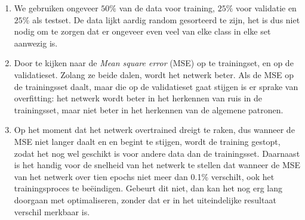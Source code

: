 \documentclass[a4paper,10pt,fleqn]{article}
\begin{document}
\begin{enumerate}[1.]
\begin{center}
	\end{center}

	\item We gebruiken ongeveer $50\%$ van de data voor training, $25\%$ voor validatie en $25\%$ als testset. De data lijkt aardig random gesorteerd te zijn, het is dus niet nodig om te zorgen dat er ongeveer even veel van elke class in elke set aanwezig is.

	\item Door te kijken naar de \textit{Mean square error} (MSE) op te trainingset, en op de validatieset. Zolang ze beide dalen, wordt het netwerk beter. Als de MSE op de trainingsset daalt, maar die op de validatieset gaat stijgen is er sprake van overfitting: het netwerk wordt beter in het herkennen van ruis in de trainingsset, maar niet beter in het herkennen van de algemene patronen.

	\item Op het moment dat het netwerk overtrained dreigt te raken, dus wanneer de MSE niet langer daalt en en begint te stijgen, wordt de training gestopt, zodat het nog wel geschikt is voor andere data dan de trainingsset. Daarnaast is het handig voor de snelheid van het netwerk te stellen dat wanneer de MSE van het netwerk over tien epochs niet meer dan 0.1\% verschilt, ook het trainingsproces te beëindigen. Gebeurt dit niet, dan kan het nog erg lang doorgaan met optimaliseren, zonder dat er in het uiteindelijke resultaat verschil merkbaar is.


\end{enumerate}
\end{document}
